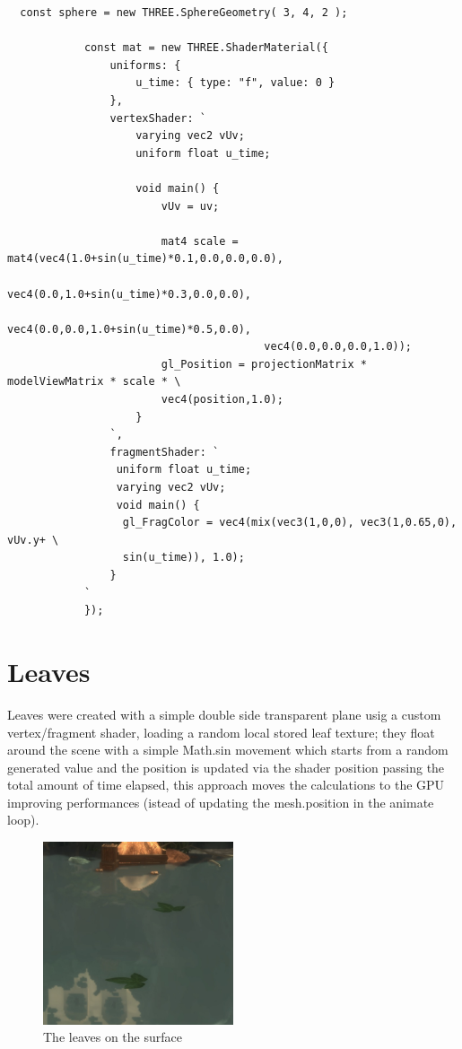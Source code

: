 \documentclass[10pt,a4paper]{article}
\begin{document}
\begin{verbatim}
  const sphere = new THREE.SphereGeometry( 3, 4, 2 );

            const mat = new THREE.ShaderMaterial({
                uniforms: {
                    u_time: { type: "f", value: 0 }
                },
                vertexShader: `
                    varying vec2 vUv;
                    uniform float u_time;

                    void main() {
                        vUv = uv;

                        mat4 scale = mat4(vec4(1.0+sin(u_time)*0.1,0.0,0.0,0.0),
                                        vec4(0.0,1.0+sin(u_time)*0.3,0.0,0.0),
                                        vec4(0.0,0.0,1.0+sin(u_time)*0.5,0.0),
                                        vec4(0.0,0.0,0.0,1.0));
                        gl_Position = projectionMatrix * modelViewMatrix * scale * \
                        vec4(position,1.0);
                    }
                `,
                fragmentShader: `
                 uniform float u_time;
                 varying vec2 vUv;
                 void main() {
                  gl_FragColor = vec4(mix(vec3(1,0,0), vec3(1,0.65,0), vUv.y+ \
                  sin(u_time)), 1.0);
                }
            `
            });
\end{verbatim}

\section{Leaves}

Leaves were created with a simple double side transparent plane usig a custom vertex/fragment shader, loading a random local stored leaf texture; they float around the scene with a simple Math.sin movement which starts from a random generated value and the position is updated via the shader position passing the total amount of time elapsed, this approach moves the calculations to the GPU improving performances (istead of updating the mesh.position in the animate loop).

\begin{figure}[H]
\centering
  \includegraphics[width=0.5\textwidth]{leaves}
     \caption{The leaves on the surface}
\end{figure}
\end{document}

